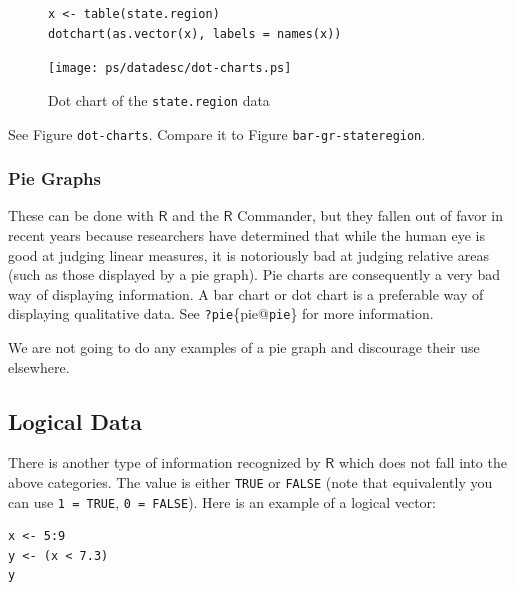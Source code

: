 \documentclass[10pt,english]{scrbook}
\begin{document}
\begin{exampletoo}

\begin{figure}[H]
\label{dot-charts}
\begin{verbatim}
x <- table(state.region)
dotchart(as.vector(x), labels = names(x))
\end{verbatim}
\end{figure}

\begin{figure}[th]
  \texttt{[image: ps/datadesc/dot-charts.ps]}
  \caption{Dot chart of the \texttt{state.region} data}
  \label{fig-dot-charts}
\end{figure}


See Figure \texttt{dot-charts}. Compare it to Figure \texttt{bar-gr-stateregion}.

\end{exampletoo}
\subsubsection[Pie Graphs]{Pie Graphs}
\label{sec-1-1-4-5}

These can be done with \(\mathsf{R}\) and the \(\mathsf{R}\) Commander, but they fallen out of favor in recent years because researchers have determined that while the human eye is good at judging linear measures, it is notoriously bad at judging relative areas (such as those displayed by a pie graph). Pie charts are consequently a very bad way of displaying information. A bar chart or dot chart is a preferable way of displaying qualitative data. See \texttt{?pie}\index\{pie@\texttt{pie}\} for more information.

We are not going to do any examples of a pie graph and discourage their use elsewhere. 
\subsection[Logical Data]{Logical Data}
\label{sec-1-1-5}

There is another type of information recognized by \(\mathsf{R}\) which does not fall into the above categories. The value is either \texttt{TRUE} or \texttt{FALSE} (note that equivalently you can use \texttt{1 = TRUE}, \texttt{0 = FALSE}). Here is an example of a logical vector:

\begin{verbatim}
x <- 5:9
y <- (x < 7.3)
y
\end{verbatim}
\end{document}
